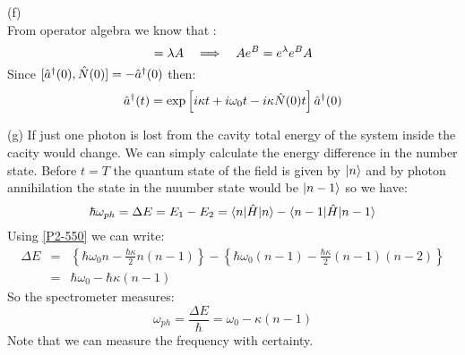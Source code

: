 \begin{homeworkProblem}
\begin{homeworkSection}{(f)}
\begin{equation}
\end{equation}
From operator algebra we know that :
\begin{equation}
[A,B]=\lambda A\quad\Lrw\quad Ae^{B}=e^\lambda e^B A
\end{equation}
Since $[\Hat{a}^\dagger(0),\Hat{N}(0)]=-\Hat{a}^\dagger(0)$ then:
\begin{equation}
\Hat{a}^\dagger(t)=\exp\left[i\kappa t+i\omega_0t-i\kappa\Hat{N}(0)t\right]\Hat{a}^\dagger(0)
\end{equation}
\end{homeworkSection}
\begin{homeworkSection}{(g)}
If just one photon is lost from the cavity total energy of the system inside the cacity would change. We can simply calculate the energy difference  in the number state. Before $t=T$ the quantum state of the field is given by $|n\rangle$ and  by photon annihilation the state in the nuumber state would be $|n-1\rangle$ so we have:  
\begin{equation}
\hbar\omega_{ph}=\Delta E=E_1-E_2=\langle n|\Hat{H}|n\rangle-\langle n-1|\Hat{H}|n-1\rangle
\end{equation}
Using \eqref{P2-550} we can write:
\begin{eqnarray}
\Delta E&=&\left\{\hbar\omega_0 n-\frac{\hbar\kappa}{2}n(n-1)\right\}-\left\{\hbar\omega_0 (n-1)-\frac{\hbar\kappa}{2}(n-1)(n-2)\right\}\nonumber\\
&=&\hbar\omega_0-\hbar\kappa(n-1)
\end{eqnarray}
So the spectrometer measures:
\begin{equation}
\omega_{ph}=\frac{\Delta E}{\hbar}=\omega_0-\kappa(n-1)
\end{equation}
Note that we can measure the frequency with certainty.
\end{homeworkSection}


\end{homeworkProblem}